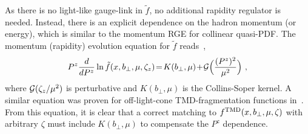 As there is no light-like gauge-link in $\tilde f$, no additional rapidity regulator is needed. Instead, there is an explicit dependence on the hadron momentum (or energy), which is similar to the momentum RGE for collinear quasi-PDF. The momentum (rapidity) evolution equation for $\tilde f$ reads~\cite{Collins:1981uk,Ji:2014hxa,Ji:2019ewn},
\begin{align}
	P^z\frac{d}{dP^z}\ln \tilde f(x,b_\perp,\mu,\zeta_z) \!=\! K(b_\perp,\mu)\!+\!{\cal G}\Big(\frac{(P^z)^2}{\mu^2}\Big) \ ,
\end{align}
where ${\cal G}(\zeta_z/\mu^2)$ is perturbative and $K(b_\perp,\mu)$ is the Collins-Soper kernel. A similar equation was proven for off-light-cone TMD-fragmentation functions in~\cite{Collins:1981uk}. From this equation, it is clear that a correct matching to $f^{\rm TMD}(x,b_\perp,\mu,\zeta)$ with arbitrary $\zeta$ must include $K(b_\perp,\mu)$ to compensate the $P^z$ dependence.

